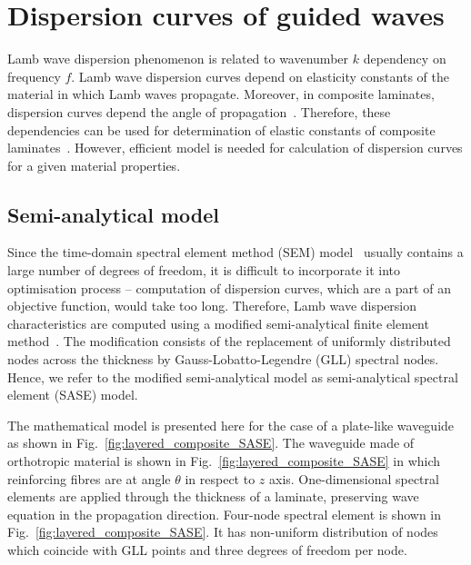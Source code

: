\documentclass[preprint,12pt]{elsarticle}
\begin{document}
\section{Dispersion curves of guided waves \label{sec:dispersion_curves}}
Lamb wave dispersion phenomenon is related to wavenumber $k$ dependency on frequency $f$. 
Lamb wave dispersion curves depend on elasticity constants of the material in which Lamb waves propagate. 
Moreover, in composite laminates, dispersion curves depend the angle of propagation~\cite{Rose1999}. 
Therefore, these dependencies can be used for determination of elastic constants of composite laminates~\cite{Kudela2020}.
However, efficient model is needed for calculation of dispersion curves for a given material properties.

\subsection{Semi-analytical model}
Since the time-domain spectral element method (SEM) model~\cite{Kudela2020a} usually contains a large number of degrees of freedom, it is difficult to incorporate it into optimisation process – computation of dispersion curves, which are a part of an objective function, would take too long. 
Therefore, Lamb wave dispersion characteristics are computed using a modified semi-analytical finite element method~\cite{Bartoli2006,Marzani2008}. 
The modification consists of the replacement of uniformly distributed nodes across the thickness by Gauss-Lobatto-Legendre (GLL) spectral nodes. 
Hence, we refer to the modified semi-analytical model as semi-analytical spectral element (SASE) model.
	
The mathematical model is presented here for the case of a plate-like waveguide as shown in Fig.~\ref{fig:layered_composite_SASE}.  
The waveguide made of orthotropic material is shown in Fig.~\ref{fig:layered_composite_SASE} in which reinforcing fibres are at angle $\theta$ in respect to $z$ axis.
One-dimensional spectral elements are applied through the thickness of a laminate, preserving wave equation in the propagation direction.  
Four-node spectral element is shown in Fig.~\ref{fig:layered_composite_SASE}. 
It has non-uniform distribution of nodes which coincide with GLL points and three degrees of freedom per node.
	
\end{document}
